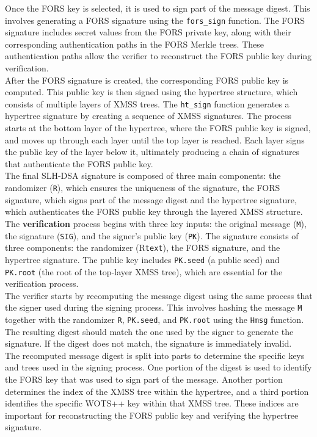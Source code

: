 \documentclass[journal=tosc,notanonymous]{iacrtrans}
\begin{document}
Once the FORS key is selected, it is used to sign part of the message digest. This involves generating a FORS signature using the \verb|fors_sign| function. The FORS signature includes secret values from the FORS private key, along with their corresponding authentication paths in the FORS Merkle trees. These authentication paths allow the verifier to reconstruct the FORS public key during verification.\\
After the FORS signature is created, the corresponding FORS public key is computed. This public key is then signed using the hypertree structure, which consists of multiple layers of XMSS trees. The \verb|ht_sign| function generates a hypertree signature by creating a sequence of XMSS signatures. The process starts at the bottom layer of the hypertree, where the FORS public key is signed, and moves up through each layer until the top layer is reached. Each layer signs the public key of the layer below it, ultimately producing a chain of signatures that authenticate the FORS public key.\\
The final SLH-DSA signature is composed of three main components:
the randomizer (\texttt{R}), which ensures the uniqueness of the signature, the FORS signature, which signs part of the message digest and the hypertree signature, which authenticates the FORS public key through the layered XMSS structure.\\
\newline
The \textbf{verification} process begins with three key inputs: the original message (\texttt{M}), the signature (\texttt{SIG}), and the signer's public key (\texttt{PK}). The signature consists of three components: the randomizer (R\texttt{text}), the FORS signature, and the hypertree signature. The public key includes \texttt{PK.seed} (a public seed) and \texttt{PK.root} (the root of the top-layer XMSS tree), which are essential for the verification process.\\
The verifier starts by recomputing the message digest using the same process that the signer used during the signing process. This involves hashing the message \texttt{M} together with the randomizer \texttt{R}, \texttt{PK.seed}, and \texttt{PK.root} using the \texttt{Hmsg} function. The resulting digest should match the one used by the signer to generate the signature. If the digest does not match, the signature is immediately invalid.\\
The recomputed message digest is split into parts to determine the specific keys and trees used in the signing process. One portion of the digest is used to identify the FORS key that was used to sign part of the message. Another portion determines the index of the XMSS tree within the hypertree, and a third portion identifies the specific WOTS++ key within that XMSS tree. These indices are important for reconstructing the FORS public key and verifying the hypertree signature.\\
\end{document}
